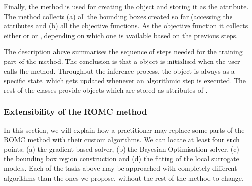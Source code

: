 Finally, the  method is used for creating
the  object and storing it as the
 attribute. The method collects (a) all the
bounding boxes created so far (accessing the
 attributes and (b) all the objective functions. As the objective function it collects either  or \linebreak {} or , depending on which one is available based on the previous steps.

The description above summarises the sequence of steps needed for the
training part of the method. The conclusion is that a 
object is initialised when the user calls the method. Throughout the
inference process, the  object is always as a specific state,
which gets updated whenever an algorithmic step is executed. The rest
of the classes provide objects which are stored as attributes of
.



\subsubsection{Extensibility of the ROMC method}

In this section, we will explain how a practitioner may replace some
parts of the ROMC method with their custom algorithms. We can locate
at least four such points; (a) the gradient-based solver, (b) the
Bayesian Optimisation solver, (c) the bounding box region construction
and (d) the fitting of the local surrogate models. Each of the
tasks above may be approached with completely different
algorithms than the ones we propose, without the rest of the method to
change.

